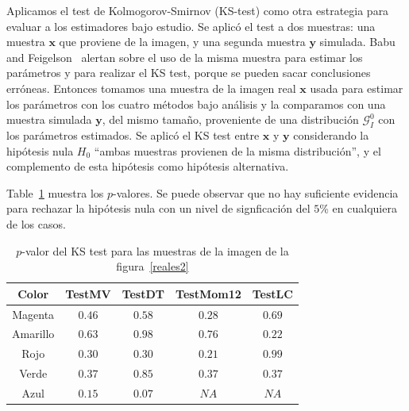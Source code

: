 Aplicamos el test de Kolmogorov-Smirnov (KS-test) como otra estrategia para evaluar a los estimadores bajo estudio. Se aplicó el test a dos muestras: una muestra $\bm x$ que proviene de la imagen, y una segunda muestra $\bm y$ simulada.
Babu and Feigelson~\cite{Jogesh2006} alertan sobre el uso de la misma muestra para estimar los parámetros y para realizar el KS test, porque se pueden sacar conclusiones erróneas. Entonces tomamos una muestra de la imagen real $\bm x$ usada para estimar los parámetros con los cuatro métodos bajo análisis y la comparamos con una muestra simulada $\bm y$, del mismo tamaño, proveniente de una distribución $\mathcal G_I^0$ con los parámetros estimados. Se aplicó el KS test entre $\bm x$ y $\bm y$ considerando la hipótesis nula $H_0$ ``ambas muestras provienen de la misma distribución'', y el complemento de esta hipótesis como hipótesis alternativa.

Table~\ref{resultadosTestMunich} muestra los $p$-valores. Se puede observar que no hay suficiente evidencia para rechazar la hipótesis nula con un nivel de signficación del $5$\% en cualquiera de los casos.

\begin{table}[htb]
	\caption{ $p$-valor del KS test para las muestras de la imagen de la figura~\ref{reales2}  }
	\centering
	\begin{tabular}{c*4{c}}
		\toprule
		Color      & TestMV    & TestDT    & TestMom12  &TestLC \\
		\midrule
		Magenta    & $0.46$    & $ 0.58$   & $0.28$   & $0.69$\\
		Amarillo   & $0.63$    & $0.98$    & $0.76$  & $0.22$\\
		Rojo       & $0.30$    & $ 0.30$   & $0.21$   & $0.99$\\
		Verde      & $0.37$    & $0.85$    & $0.37$   & $0.37$\\
		Azul       & $0.15$    & $0.07$    & $NA $    & $NA $\\
		\bottomrule
	\end{tabular}
	\label{resultadosTestMunich}
\end{table}

